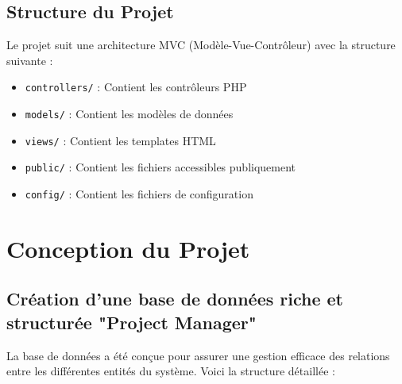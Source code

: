 \documentclass[12pt,a4paper]{article}
\begin{document}
\subsection{Structure du Projet}
Le projet suit une architecture MVC (Modèle-Vue-Contrôleur) avec la structure suivante :
\begin{itemize}
    \item \texttt{controllers/} : Contient les contrôleurs PHP
    \item \texttt{models/} : Contient les modèles de données
    \item \texttt{views/} : Contient les templates HTML
    \item \texttt{public/} : Contient les fichiers accessibles publiquement
    \item \texttt{config/} : Contient les fichiers de configuration
\end{itemize}

\section{Conception du Projet}
\subsection{Création d'une base de données riche et structurée "Project Manager"}
La base de données a été conçue pour assurer une gestion efficace des relations entre les différentes entités du système. Voici la structure détaillée :
\end{document}
